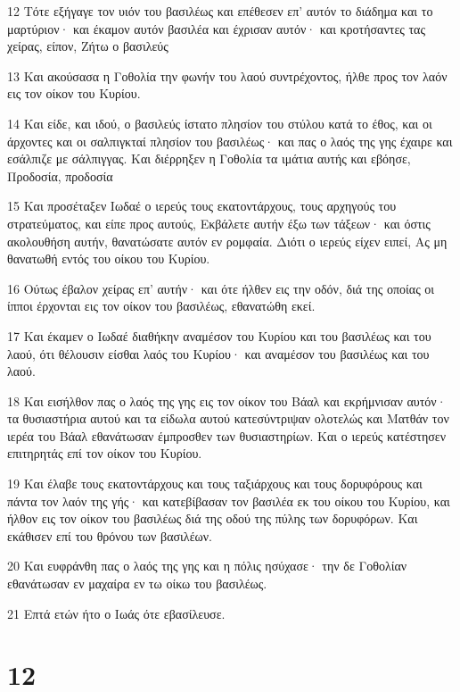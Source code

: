 \par 12 Τότε εξήγαγε τον υιόν του βασιλέως και επέθεσεν επ' αυτόν το διάδημα και το μαρτύριον· και έκαμον αυτόν βασιλέα και έχρισαν αυτόν· και κροτήσαντες τας χείρας, είπον, Ζήτω ο βασιλεύς
\par 13 Και ακούσασα η Γοθολία την φωνήν του λαού συντρέχοντος, ήλθε προς τον λαόν εις τον οίκον του Κυρίου.
\par 14 Και είδε, και ιδού, ο βασιλεύς ίστατο πλησίον του στύλου κατά το έθος, και οι άρχοντες και οι σαλπιγκταί πλησίον του βασιλέως· και πας ο λαός της γης έχαιρε και εσάλπιζε με σάλπιγγας. Και διέρρηξεν η Γοθολία τα ιμάτια αυτής και εβόησε, Προδοσία, προδοσία
\par 15 Και προσέταξεν Ιωδαέ ο ιερεύς τους εκατοντάρχους, τους αρχηγούς του στρατεύματος, και είπε προς αυτούς, Εκβάλετε αυτήν έξω των τάξεων· και όστις ακολουθήση αυτήν, θανατώσατε αυτόν εν ρομφαία. Διότι ο ιερεύς είχεν ειπεί, Ας μη θανατωθή εντός του οίκου του Κυρίου.
\par 16 Ούτως έβαλον χείρας επ' αυτήν· και ότε ήλθεν εις την οδόν, διά της οποίας οι ίπποι έρχονται εις τον οίκον του βασιλέως, εθανατώθη εκεί.
\par 17 Και έκαμεν ο Ιωδαέ διαθήκην αναμέσον του Κυρίου και του βασιλέως και του λαού, ότι θέλουσιν είσθαι λαός του Κυρίου· και αναμέσον του βασιλέως και του λαού.
\par 18 Και εισήλθον πας ο λαός της γης εις τον οίκον του Βάαλ και εκρήμνισαν αυτόν· τα θυσιαστήρια αυτού και τα είδωλα αυτού κατεσύντριψαν ολοτελώς και Ματθάν τον ιερέα του Βάαλ εθανάτωσαν έμπροσθεν των θυσιαστηρίων. Και ο ιερεύς κατέστησεν επιτηρητάς επί τον οίκον του Κυρίου.
\par 19 Και έλαβε τους εκατοντάρχους και τους ταξιάρχους και τους δορυφόρους και πάντα τον λαόν της γής· και κατεβίβασαν τον βασιλέα εκ του οίκου του Κυρίου, και ήλθον εις τον οίκον του βασιλέως διά της οδού της πύλης των δορυφόρων. Και εκάθισεν επί του θρόνου των βασιλέων.
\par 20 Και ευφράνθη πας ο λαός της γης και η πόλις ησύχασε· την δε Γοθολίαν εθανάτωσαν εν μαχαίρα εν τω οίκω του βασιλέως.
\par 21 Επτά ετών ήτο ο Ιωάς ότε εβασίλευσε.

\chapter{12}

